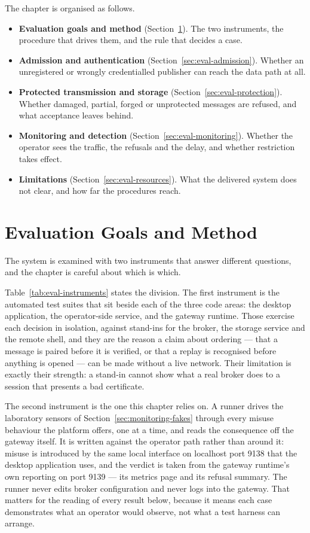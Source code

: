 \documentclass[12pt,a4paper]{report}
\begin{document}
The chapter is organised as follows.

\begin{itemize}
    \item \textbf{Evaluation goals and method}
    (Section~\ref{sec:eval-method}).
    The two instruments, the procedure that drives them,
    and the rule that decides a case.
    \item \textbf{Admission and authentication}
    (Section~\ref{sec:eval-admission}).
    Whether an unregistered or wrongly credentialled
    publisher can reach the data path at all.
    \item \textbf{Protected transmission and storage}
    (Section~\ref{sec:eval-protection}).
    Whether damaged, partial, forged or unprotected
    messages are refused, and what acceptance leaves
    behind.
    \item \textbf{Monitoring and detection}
    (Section~\ref{sec:eval-monitoring}).
    Whether the operator sees the traffic, the refusals
    and the delay, and whether restriction takes effect.
    \item \textbf{Limitations}
    (Section~\ref{sec:eval-resources}).
    What the delivered system does not clear, and how far
    the procedures reach.
\end{itemize}

\section{Evaluation Goals and Method}
\label{sec:eval-method}

The system is examined with two instruments that answer
different questions, and the chapter is careful about
which is which.

Table~\ref{tab:eval-instruments} states the division. The
first instrument is the automated test suites that sit
beside each of the three code areas: the desktop
application, the operator-side service, and the gateway
runtime. Those exercise each decision in isolation,
against stand-ins for the broker, the storage service and
the remote shell, and they are the reason a claim about
ordering --- that a message is paired before it is
verified, or that a replay is recognised before anything
is opened --- can be made without a live network. Their
limitation is exactly their strength: a stand-in cannot
show what a real broker does to a session that presents a
bad certificate.

The second instrument is the one this chapter relies on.
A runner drives the laboratory sensors of
Section~\ref{sec:monitoring-fakes} through every misuse
behaviour the platform offers, one at a time, and reads
the consequence off the gateway itself. It is written
against the operator path rather than around it: misuse is
introduced by the same local interface on localhost port
9138 that the desktop application uses, and the verdict is
taken from the gateway runtime's own reporting on port
9139 --- its metrics page and its refusal summary. The
runner never edits broker configuration and never logs
into the gateway. That matters for the reading of every
result below, because it means each case demonstrates what
an operator would observe, not what a test harness can
arrange.
\end{document}
